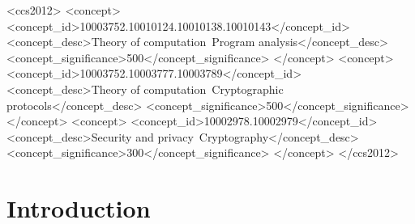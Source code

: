 \documentclass[sigconf, screen, natbib=false, dvipsnames, table]{acmart}
\theoremstyle{definition}
\begin{document}
\begin{abstract}


\end{abstract}


%
%
\begin{CCSXML}
<ccs2012>
<concept>
<concept_id>10003752.10010124.10010138.10010143</concept_id>
<concept_desc>Theory of computation~Program analysis</concept_desc>
<concept_significance>500</concept_significance>
</concept>
<concept>
<concept_id>10003752.10003777.10003789</concept_id>
<concept_desc>Theory of computation~Cryptographic protocols</concept_desc>
<concept_significance>500</concept_significance>
</concept>
<concept>
<concept_id>10002978.10002979</concept_id>
<concept_desc>Security and privacy~Cryptography</concept_desc>
<concept_significance>300</concept_significance>
</concept>
</ccs2012>
\end{CCSXML}


%

%
\maketitle


\section{Introduction}
\label{sec:introduction}
\end{document}
